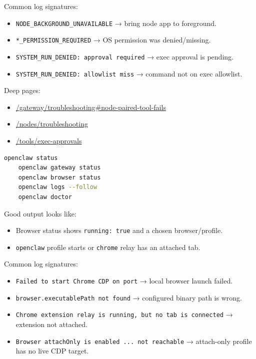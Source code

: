 Common log signatures:

\begin{itemize}
  \item \texttt{NODE\_BACKGROUND\_UNAVAILABLE} → bring node app to foreground.
  \item \texttt{*\_PERMISSION\_REQUIRED} → OS permission was denied/missing.
  \item \texttt{SYSTEM\_RUN\_DENIED: approval required} → exec approval is pending.
  \item \texttt{SYSTEM\_RUN\_DENIED: allowlist miss} → command not on exec allowlist.
\end{itemize}


Deep pages:

\begin{itemize}
  \item \href{/gateway/troubleshooting\#node-paired-tool-fails}{/gateway/troubleshooting\#node-paired-tool-fails}
  \item \href{/nodes/troubleshooting}{/nodes/troubleshooting}
  \item \href{/tools/exec-approvals}{/tools/exec-approvals}
\end{itemize}



\begin{lstlisting}[language=bash]
    openclaw status
    openclaw gateway status
    openclaw browser status
    openclaw logs --follow
    openclaw doctor
\end{lstlisting}


Good output looks like:

\begin{itemize}
  \item Browser status shows \texttt{running: true} and a chosen browser/profile.
  \item \texttt{openclaw} profile starts or \texttt{chrome} relay has an attached tab.
\end{itemize}


Common log signatures:

\begin{itemize}
  \item \texttt{Failed to start Chrome CDP on port} → local browser launch failed.
  \item \texttt{browser.executablePath not found} → configured binary path is wrong.
  \item \texttt{Chrome extension relay is running, but no tab is connected} → extension not attached.
  \item \texttt{Browser attachOnly is enabled ... not reachable} → attach-only profile has no live CDP target.
\end{itemize}


